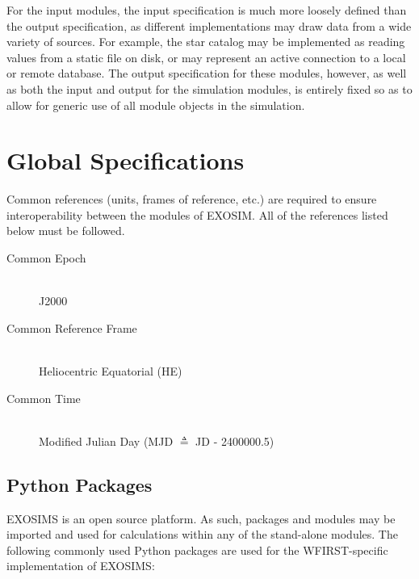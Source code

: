 \documentclass[cleanfoot]{asme2ej}
\begin{document}
For the input modules, the input specification is much more loosely defined than the output specification, as different implementations may draw data from a wide variety of sources.  For example, the star catalog may be implemented as reading values from a static file on disk, or may represent an active connection to a local or remote database.  The output specification for these modules, however, as well as both the input and output for the simulation modules, is entirely fixed so as to allow for generic use of all module objects in the simulation.


\section{Global Specifications}
Common references (units, frames of reference, etc.) are required to ensure interoperability between the modules of EXOSIM.  All of the references listed below must be followed.

\begin{description}
    \item[Common Epoch] \hfill \\ J2000
    \item[Common Reference Frame] \hfill \\ Heliocentric Equatorial (HE)
    \item[Common Time] \hfill \\ Modified Julian Day (MJD $\triangleq$ JD - 2400000.5)
\end{description}

\subsection{Python Packages} 
EXOSIMS is an open source platform.  As such, packages and modules may be imported and used for calculations within any of the stand-alone modules.  The following commonly used Python packages are used for the WFIRST-specific implementation of EXOSIMS:
\end{document}

